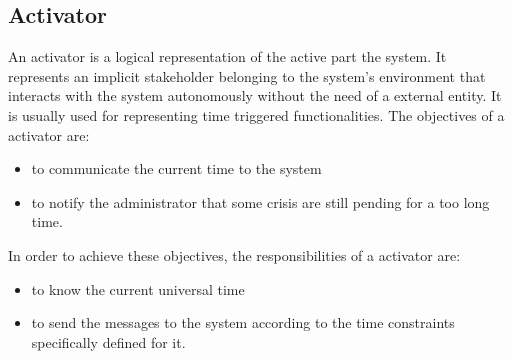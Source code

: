 \subsection{Activator}
An activator is a logical representation of the active part the \msrprojectname system.
It represents an implicit stakeholder belonging to the system's environment that
interacts with the \msrprojectname system autonomously without the need of a external
entity. It is usually used for representing time triggered functionalities. The
objectives of a activator are:
\begin{itemize}
\item to communicate the current time to the system
\item to notify the administrator that some crisis are still pending for a too
 long time.
\end{itemize}
In order to achieve these objectives, the responsibilities of a activator are:
\begin{itemize}
\item to know the current universal time
\item to send the messages to the system according to the time constraints
 specifically defined for it.
\end{itemize}
\newpage

